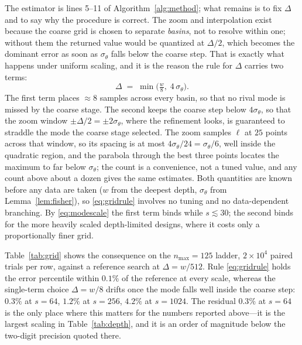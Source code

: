 \documentclass[%
 twocolumn,
 amsmath,amssymb,
prx,
longbibliography
]{revtex4-2}
\begin{document}
The estimator is lines 5--11 of Algorithm~\ref{alg:method}; what remains is to fix $\Delta$ and to say why the procedure is correct. The zoom and interpolation exist because the coarse grid is chosen to separate \emph{basins}, not to resolve within one; without them the returned value would be quantized at $\Delta/2$, which becomes the dominant error as soon as $\sigma_\theta$ falls below the coarse step. That is exactly what happens under uniform scaling, and it is the reason the rule for $\Delta$ carries two terms:
\begin{equation}\label{eq:gridrule}
    \Delta \;=\; \min\!\Big(\tfrac{w}{8},\; 4\,\sigma_\theta\Big).
\end{equation}
The first term places $\approx 8$ samples across every basin, so that no rival mode is missed by the coarse stage. The second keeps the coarse step below $4\sigma_\theta$, so that the zoom window $\pm\Delta/2 = \pm 2\sigma_\theta$, where the refinement looks, is guaranteed to straddle the mode the coarse stage selected. The zoom samples $\ell$ at $25$ points across that window, so its spacing is at most $4\sigma_\theta/24 = \sigma_\theta/6$, well inside the quadratic region, and the parabola through the best three points locates the maximum to far below $\sigma_\theta$; the count is a convenience, not a tuned value, and any count above about a dozen gives the same estimates. Both quantities are known before any data are taken ($w$ from the deepest depth, $\sigma_\theta$ from Lemma~\ref{lem:fisher}), so \eqref{eq:gridrule} involves no tuning and no data-dependent branching. By \eqref{eq:modescale} the first term binds while $s \lesssim 30$; the second binds for the more heavily scaled depth-limited designs, where it costs only a proportionally finer grid.

Table~\ref{tab:grid} shows the consequence on the $n_{\max} = 125$ ladder, $2\times10^4$ paired trials per row, against a reference search at $\Delta = w/512$. Rule \eqref{eq:gridrule} holds the error percentile within $0.1\%$ of the reference at every scale, whereas the single-term choice $\Delta = w/8$ drifts once the mode falls well inside the coarse step: $0.3\%$ at $s = 64$, $1.2\%$ at $s = 256$, $4.2\%$ at $s = 1024$. The residual $0.3\%$ at $s = 64$ is the only place where this matters for the numbers reported above---it is the largest scaling in Table~\ref{tab:depth}, and it is an order of magnitude below the two-digit precision quoted there.
\end{document}
